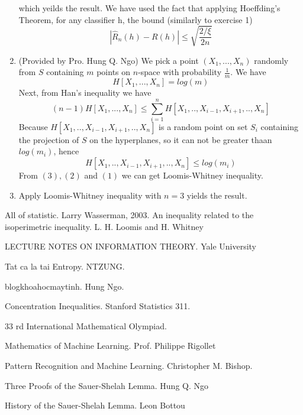 \documentclass[10pt]{article}
\begin{document}
\begin{enumerate}
which yeilds the result. We have used the fact that applying Hoeffding’s Theorem, for any classifier h, the bound (similarly to exercise 1)
\[ |\hat{R}_n(h) - R(h)| \leqslant \sqrt{\frac{2/\xi}{2n}}\]
\item (Provided by Pro. Hung Q. Ngo) We pick a point $(X_1,...,X_n)$ randomly from $S$ containing $m$ points on $n$-space  with probability $\frac{1}{m}$. We have
\[ H[X_1,...,X_n] = log(m) \tag{1}\]
Next, from Han's inequality we have
\[ (n-1)H[X_1,...,X_n] \leqslant \sum_{i=1}^{n}H[X_1,..,X_{i-1},X_{i+1},..,X_n] \tag{2} \]
Because $H[X_1,..,X_{i-1},X_{i+1},..,X_n]$ is a random point on set $S_i$ containing the projection of $S$ on the hyperplanes, so it can not be greater thaan $log(m_i)$, hence
\[ H[X_1,..,X_{i-1},X_{i+1},..,X_n] \leqslant log(m_i) \tag{3} \]
From $(3), (2)$ and $(1)$ we can get Loomis-Whitney inequality.
\item Apply Loomis-Whitney inequality with $n=3$ yields the result.
\end{enumerate}
\begin{thebibliography}{9}
All of statistic. 
\textit{}
Larry Wasserman, 2003.
An inequality related to the isoperimetric inequality. 
\textit{}
L. H. Loomis and H. Whitney

LECTURE NOTES ON INFORMATION THEORY. 
\textit{}
Yale University

Tat ca la tai Entropy. 
\textit{}
NTZUNG.

blogkhoahocmaytinh. 
\textit{}
Hung Ngo.

Concentration Inequalities. 
\textit{}
Stanford Statistics 311.

33 rd International Mathematical Olympiad. 

Mathematics of Machine Learning. 
\textit{}
Prof. Philippe Rigollet

Pattern Recognition and Machine Learning. 
\textit{}
Christopher M. Bishop.

Three Proofs of the Sauer-Shelah Lemma. 
\textit{}
Hung Q. Ngo

History of the Sauer-Shelah Lemma. 
\textit{}
Leon Bottou

\end{thebibliography}
\end{document}

